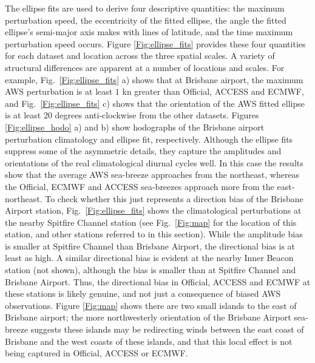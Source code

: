 \documentclass{ametsoc}
\begin{document}
The ellipse fits are used to derive four descriptive quantities: the maximum perturbation speed, the eccentricity of the fitted ellipse, the angle the fitted ellipse's semi-major axis makes with lines of latitude, and the time maximum perturbation speed occurs. Figure \ref{Fig:ellipse_fits} provides these four quantities for each dataset and location across the three spatial scales. A variety of structural differences are apparent at a number of locations and scales. For example, Fig.~\ref{Fig:ellipse_fits} a) shows that at Brisbane airport, the maximum AWS perturbation is at least $1$ kn greater than Official, ACCESS and ECMWF, and Fig.~\ref{Fig:ellipse_fits} c) shows that the orientation of the AWS fitted ellipse is at least 20 degrees anti-clockwise from the other datasets. Figures \ref{Fig:ellipse_hodo} a) and b) show hodographs of the Brisbane airport perturbation climatology and ellipse fit, respectively. Although the ellipse fits suppress some of the asymmetric details, they capture the amplitudes and orientations of the real climatological diurnal cycles well. In this case the results show that the average AWS sea-breeze approaches from the northeast, whereas the Official, ECMWF and ACCESS sea-breezes approach more from the east-northeast. To check whether this just represents a direction bias of the Brisbane Airport station, Fig.~\ref{Fig:ellipse_fits} shows the climatological perturbations at the nearby Spitfire Channel station (see Fig.~\ref{Fig:map} for the location of this station, and other stations referred to in this section). While the amplitude bias is smaller at Spitfire Channel than Brisbane Airport, the directional bias is at least as high. A similar directional bias is evident at the nearby Inner Beacon station (not shown), although the bias is smaller than at Spitfire Channel and Brisbane Airport. Thus, the directional bias in Official, ACCESS and ECMWF at these stations is likely genuine, and not just a consequence of biased AWS observations. Figure \ref{Fig:map} shows there are two small islands to the east of Brisbane airport; the more northwesterly orientation of the Brisbane Airport sea-breeze suggests these islands may be redirecting winds between the east coast of Brisbane and the west coasts of these islands, and that this local effect is not being captured in Official, ACCESS or ECMWF.            
\end{document}
